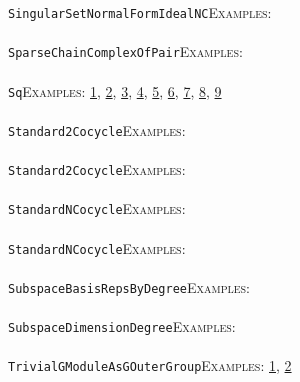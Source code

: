 \documentclass[a4paper,11pt]{report}
\begin{document}
{{ \texttt{SingularSetNormalFormIdealNC}{\nobreakspace}{\nobreakspace}{\nobreakspace}{\nobreakspace}\textsc{Examples:} \\
 \\
 \texttt{SparseChainComplexOfPair}{\nobreakspace}{\nobreakspace}{\nobreakspace}{\nobreakspace}\textsc{Examples:} \\
 \\
 \texttt{Sq}{\nobreakspace}{\nobreakspace}{\nobreakspace}{\nobreakspace}\textsc{Examples:} \href{tutorial/chap7.html} {1}{\nobreakspace}, \href{../www/SideLinks/About/aboutArtinGroups.html} {2}{\nobreakspace}, \href{../www/SideLinks/About/aboutModPRings.html} {3}{\nobreakspace}, \href{../www/SideLinks/About/aboutAspherical.html} {4}{\nobreakspace}, \href{../www/SideLinks/About/aboutNonabelian.html} {5}{\nobreakspace}, \href{../www/SideLinks/About/aboutQuandles2.html} {6}{\nobreakspace}, \href{../www/SideLinks/About/aboutKnots.html} {7}{\nobreakspace}, \href{../www/SideLinks/About/aboutTensorSquare.html} {8}{\nobreakspace}, \href{../www/SideLinks/About/aboutKnotsQuandles.html} {9}{\nobreakspace} \\
 \\
 \texttt{Standard2Cocycle}{\nobreakspace}{\nobreakspace}{\nobreakspace}{\nobreakspace}\textsc{Examples:} \\
 \\
 \texttt{Standard2Cocycle}{\nobreakspace}{\nobreakspace}{\nobreakspace}{\nobreakspace}\textsc{Examples:} \\
 \\
 \texttt{StandardNCocycle}{\nobreakspace}{\nobreakspace}{\nobreakspace}{\nobreakspace}\textsc{Examples:} \\
 \\
 \texttt{StandardNCocycle}{\nobreakspace}{\nobreakspace}{\nobreakspace}{\nobreakspace}\textsc{Examples:} \\
 \\
 \texttt{SubspaceBasisRepsByDegree}{\nobreakspace}{\nobreakspace}{\nobreakspace}{\nobreakspace}\textsc{Examples:} \\
 \\
 \texttt{SubspaceDimensionDegree}{\nobreakspace}{\nobreakspace}{\nobreakspace}{\nobreakspace}\textsc{Examples:} \\
 \\
 \texttt{TrivialGModuleAsGOuterGroup}{\nobreakspace}{\nobreakspace}{\nobreakspace}{\nobreakspace}\textsc{Examples:} \href{../www/SideLinks/About/aboutCoefficientSequence.html} {1}{\nobreakspace}, \href{../www/SideLinks/About/aboutGouter.html} {2}{\nobreakspace} \\
}}
\end{document}
